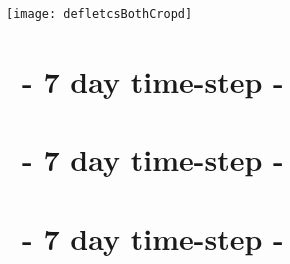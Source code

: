 \label{chap:results}

\begin{figure*}
	\texttt{[image: defletcsBothCropd]}
	\caption[\popSevenII tracks.]{Baseline-shifted tracks. Left: anticyclones. Right: cyclones. Color represents \textit{birth}-latitude. Thickness (hardly noticeable) represents $\IQ$. Data is from a predecessor run to \popSevenII.}
	\label{fig:defletcsBothCropd}
\end{figure*}





\section{\mi~- 7 day time-step - \avi}
\label{section:aviI}


\section{\mii~- 7 day time-step - \avi}
\label{section:aviII}


\section{\mii~- 7 day time-step - \pop}
\label{section:pop7II}


%




%

